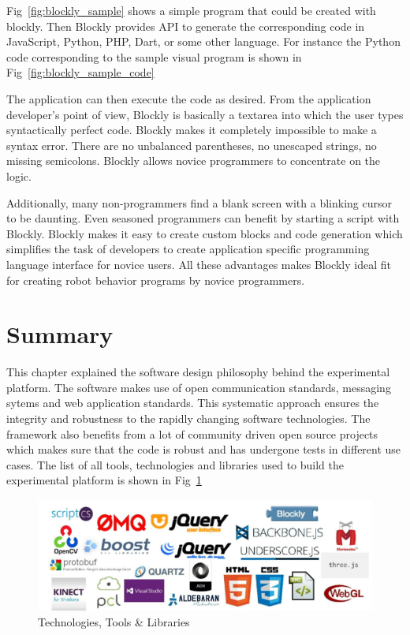 Fig~\ref{fig:blockly_sample} shows a simple program that could be created with blockly. Then Blockly provides API to generate the corresponding code in JavaScript, Python, PHP, Dart, or some other language. For instance the Python code corresponding to the sample visual program is shown in Fig~\ref{fig:blockly_sample_code}

The application can then execute the code as desired. From the application developer's point of view, Blockly is basically a textarea into which the user types syntactically perfect code.  Blockly makes it completely impossible to make a syntax error. There are no unbalanced parentheses, no unescaped strings, no missing semicolons. Blockly allows novice programmers to concentrate on the logic.

Additionally, many non-programmers find a blank screen with a blinking cursor to be daunting. Even seasoned programmers can benefit by starting a script with Blockly. Blockly makes it easy to create custom blocks and code generation which simplifies the task of developers to create application specific programming language interface for novice users. All these advantages makes Blockly ideal fit for creating robot behavior programs by novice programmers.

\section{Summary}

This chapter explained the software design philosophy behind the experimental platform. The software makes use of open communication standards, messaging sytems and web application standards. This systematic approach ensures the integrity and robustness to the rapidly changing software technologies. The framework also benefits from a lot of community driven open source projects which makes sure that the code is robust and has undergone tests in different use cases. The list of all tools, technologies and libraries used to build the experimental platform is shown in Fig~\ref{fig:libraries_used}
\begin{figure}
\centering
\includegraphics[width=\textwidth]{assets/libs.jpg}
\caption[Technologies, Tools \& Libraries]{Technologies, Tools \& Libraries}
\label{fig:libraries_used}
\end{figure}
